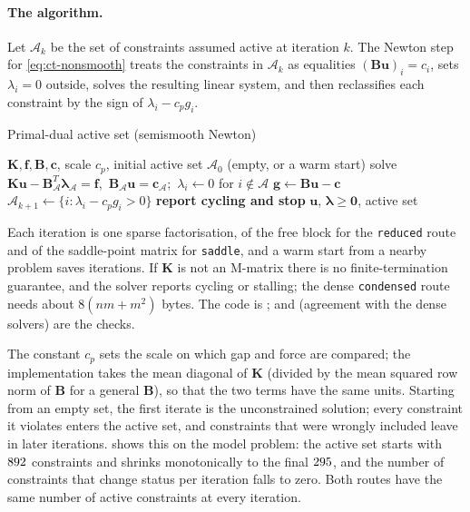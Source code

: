 \paragraph{The algorithm.}
Let $\mathcal A_k$ be the set of constraints assumed active at iteration $k$. The Newton step for \eqref{eq:ct-nonsmooth} treats the constraints in $\mathcal A_k$ as equalities $(\bm B\bm u)_i=c_i$, sets $\lambda_i=0$ outside, solves the resulting linear system, and then reclassifies each constraint by the sign of $\lambda_i-c_pg_i$.

\begin{algbox}{Primal-dual active set (semismooth Newton)}
\begin{pseudo}
\Require $\bm K,\bm f,\bm B,\bm c$, scale $c_p$, initial active set $\mathcal A_0$ (empty, or a warm start)
\Repeat
  \State solve $\bm K\bm u-\bm B_{\mathcal A}^T\bm\lambda_{\mathcal A}=\bm f$,\ $\bm B_{\mathcal A}\bm u=\bm c_{\mathcal A}$;\ $\lambda_i\gets0$ for $i\notin\mathcal A$ 
  \State $\bm g\gets\bm B\bm u-\bm c$
  \State $\mathcal A_{k+1}\gets\{i:\lambda_i-c_pg_i>0\}$
   \textbf{report cycling and stop} \EndIf
{}
\Ensure $\bm u$, $\bm\lambda\ge\bm0$, active set
\end{pseudo}
\end{algbox}

Each iteration is one sparse factorisation, of the free block for the \texttt{reduced} route and of the saddle-point matrix for \texttt{saddle}, and a warm start from a nearby problem saves iterations. If $\bm K$ is not an M-matrix there is no finite-termination guarantee, and the solver reports cycling or stalling; the dense \texttt{condensed} route needs about $8(nm+m^2)$ bytes. The code is ;  and  (agreement with the dense solvers) are the checks.


The constant $c_p$ sets the scale on which gap and force are compared; the implementation takes the mean diagonal of $\bm K$ (divided by the mean squared row norm of $\bm B$ for a general $\bm B$), so that the two terms have the same units. Starting from an empty set, the first iterate is the unconstrained solution; every constraint it violates enters the active set, and constraints that were wrongly included leave in later iterations.  shows this on the model problem: the active set starts with $892$ constraints and shrinks monotonically to the final $295$, and the number of constraints that change status per iteration falls to zero. Both routes have the same number of active constraints at every iteration.


